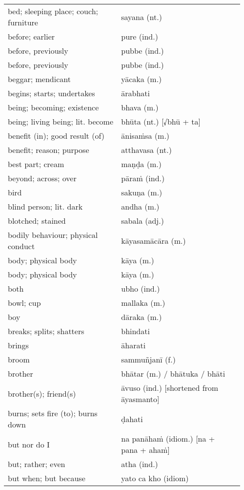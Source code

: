 \documentclass[a5paper]{memoir}
\begin{document}
\begin{longtable}{L{0.48\linewidth} L{0.48\linewidth} H}
bed; sleeping place; couch; furniture & sayana (nt.) & \\[0pt]
before; earlier & pure (ind.) & \\[0pt]
before, previously & pubbe (ind.) & \\[0pt]
before, previously & pubbe (ind.) & \\[0pt]
beggar; mendicant & yācaka (m.) & \\[0pt]
begins; starts; undertakes & ārabhati & \\[0pt]
being; becoming; existence & bhava (m.) & \\[0pt]
being; living being; lit. become & bhūta (nt.) [√bhū + ta] & \\[0pt]
benefit (in); good result (of) & ānisaṁsa (m.) & \\[0pt]
benefit; reason; purpose & atthavasa (nt.) & \\[0pt]
best part; cream & maṇḍa (m.) & \\[0pt]
beyond; across; over & pāraṁ (ind.) & \\[0pt]
bird & sakuṇa (m.) & \\[0pt]
blind person; lit. dark & andha (m.) & \\[0pt]
blotched; stained & sabala (adj.) & \\[0pt]
bodily behaviour; physical conduct & kāyasamācāra (m.) & \\[0pt]
body; physical body & kāya (m.) & \\[0pt]
body; physical body & kāya (m.) & \\[0pt]
both & ubho (ind.) & \\[0pt]
bowl; cup & mallaka (m.) & \\[0pt]
boy & dāraka (m.) & \\[0pt]
breaks; splits; shatters & bhindati & \\[0pt]
brings & āharati & \\[0pt]
broom & sammuñjanī (f.) & \\[0pt]
brother & bhātar (m.) / bhātuka / bhāti & \\[0pt]
brother(s); friend(s) & āvuso (ind.) [shortened from āyasmanto] & \\[0pt]
burns; sets fire (to); burns down & ḍahati & \\[0pt]
but nor do I & na panāhaṁ (idiom.) [na + pana + ahaṁ] & \\[0pt]
but; rather; even & atha (ind.) & \\[0pt]
but when; but because & yato ca kho (idiom) & \\[0pt]

\end{longtable}
\end{document}
